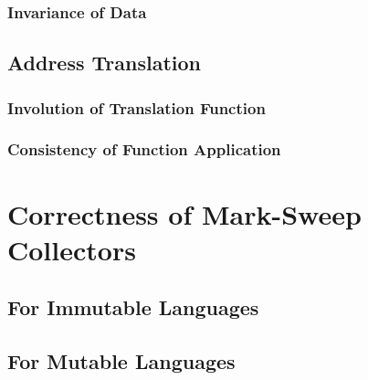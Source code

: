 \subsubsection{Invariance of Data}

\subsection{Address Translation}

\subsubsection{Involution of Translation Function}

\subsubsection{Consistency of Function Application}

\section{Correctness of Mark-Sweep Collectors}


\subsection{For Immutable Languages}


\subsection{For Mutable Languages}

